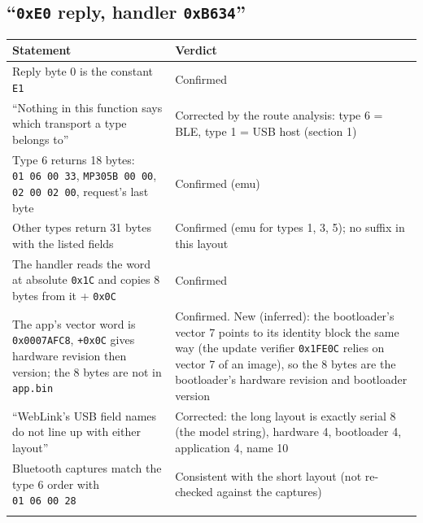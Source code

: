 \subsection{\texorpdfstring{``\texttt{0xE0} reply, handler
\texttt{0xB634}''}{``0xE0 reply, handler 0xB634''}}\label{xe0-reply-handler-0xb634}

{\def\LTcaptype{none} %
\begin{longtable}[]{@{}
  >{\raggedright\arraybackslash}p{}
  >{\raggedright\arraybackslash}p{}@{}}
\toprule\noalign{}
\begin{minipage}[b]{\linewidth}\raggedright
Statement
\end{minipage} & \begin{minipage}[b]{\linewidth}\raggedright
Verdict
\end{minipage} \\
\midrule\noalign{}
\endhead
\bottomrule\noalign{}
\endlastfoot
Reply byte 0 is the constant \texttt{E1} & Confirmed \\
``Nothing in this function says which transport a type belongs to'' &
Corrected by the route analysis: type 6 = BLE, type 1 = USB host
(section 1) \\
Type 6 returns 18 bytes: \texttt{01\ 06\ 00\ 33},
\texttt{MP305B\ 00\ 00}, \texttt{02\ 00\ 02\ 00}, request's last byte &
Confirmed (emu) \\
Other types return 31 bytes with the listed fields & Confirmed (emu for
types 1, 3, 5); no suffix in this layout \\
The handler reads the word at absolute \texttt{0x1C} and copies 8 bytes
from it + \texttt{0x0C} & Confirmed \\
The app's vector word is \texttt{0x0007AFC8}, \texttt{+0x0C} gives
hardware revision then version; the 8 bytes are not in \texttt{app.bin}
& Confirmed. New (inferred): the bootloader's vector 7 points to its
identity block the same way (the update verifier \texttt{0x1FE0C} relies
on vector 7 of an image), so the 8 bytes are the bootloader's hardware
revision and bootloader version \\
``WebLink's USB field names do not line up with either layout'' &
Corrected: the long layout is exactly serial 8 (the model string),
hardware 4, bootloader 4, application 4, name 10 \\
Bluetooth captures match the type 6 order with \texttt{01\ 06\ 00\ 28} &
Consistent with the short layout (not re-checked against the
captures) \\*
\end{longtable}
}

